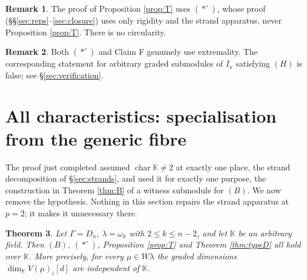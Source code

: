 \documentclass[reqno]{amsart}
\theoremstyle{plain}
\newtheorem{theorem}{Theorem}[section]
\theoremstyle{definition}
\newtheorem{remark}[theorem]{Remark}
\newcommand{\la}{\lambda}
\newcommand{\om}{\omega}
\newcommand{\ka}{\kappa}
\begin{document}
\begin{remark}
The proof of Proposition \ref{prop:T} uses $(*^\circ)$, whose proof
(\S\S\ref{sec:reps}--\ref{sec:closure}) uses only rigidity and the strand
apparatus, never Proposition \ref{prop:T}.  There is no circularity.
\end{remark}

\begin{remark}
Both $(*^\circ)$ and Claim F genuinely use extremality.  The corresponding
statement for arbitrary graded submodules of $I_\ka$ satisfying $(H)$ is false;
see \S\ref{sec:verification}.
\end{remark}

\section{All characteristics: specialisation from the generic fibre}
\label{sec:charp}

The proof just completed assumed $\operatorname{char}\mathbb{K}\ne2$ at exactly
one place, the strand decomposition of \S\ref{sec:strands}, and used it for
exactly one purpose, the construction in Theorem \ref{thm:B} of a witness
submodule for $(B)$.  We now remove the hypothesis.  Nothing in this section
repairs the strand apparatus at $p=2$; it makes it unnecessary there.

\begin{theorem}\label{thm:charp}
Let $\Gamma=D_n$, $\la=\om_k$ with $2\le k\le n-2$, and let $\mathbb{K}$ be an
arbitrary field.  Then $(B)$, $(*^\circ)$, Proposition \ref{prop:T} and Theorem
\ref{thm:typeD} all hold over $\mathbb{K}$.  More precisely, for every
$\mu\in W\la$ the graded dimensions $\dim_{\mathbb{K}}V(\mu)_i[d]$ are
independent of $\mathbb{K}$.
\end{theorem}
\end{document}
